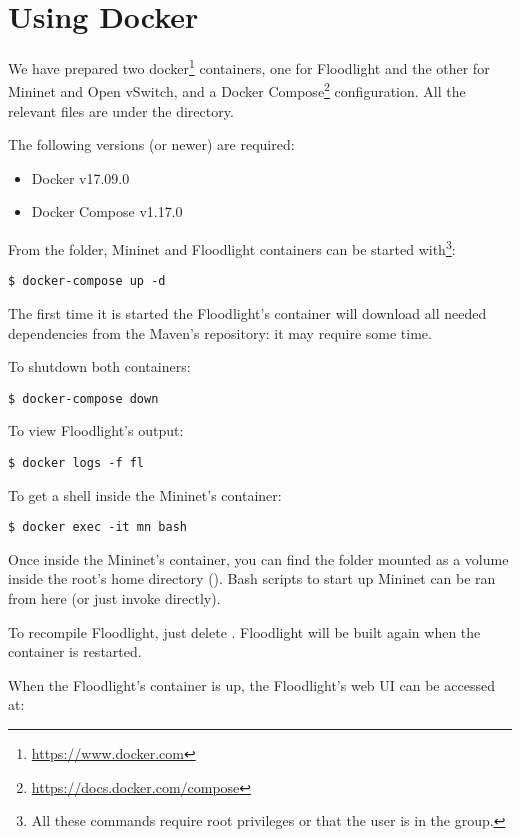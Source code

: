 \section{Using Docker}

We have prepared two docker\footnote{\url{https://www.docker.com}} containers,
one for Floodlight and the other for Mininet and Open vSwitch, and a Docker
Compose\footnote{\url{https://docs.docker.com/compose}} configuration. All the
relevant files are under the  directory.

The following versions (or newer) are required:
\begin{itemize}
	\item Docker v17.09.0
	\item Docker Compose v1.17.0
\end{itemize}

From the  folder, Mininet and Floodlight containers can be started
with\footnote{All these commands require root privileges or that the user is in
the  group.}:
\begin{verbatim}
$ docker-compose up -d
\end{verbatim}

The first time it is started the Floodlight's container will download all needed
dependencies from the Maven's repository: it may require some time.

To shutdown both containers:
\begin{verbatim}
$ docker-compose down
\end{verbatim}

To view Floodlight's output:
\begin{verbatim}
$ docker logs -f fl
\end{verbatim}

To get a shell inside the Mininet's container:
\begin{verbatim}
$ docker exec -it mn bash
\end{verbatim}
Once inside the Mininet's container, you can find the  folder
mounted as a volume inside the root's home directory ().
Bash scripts to start up Mininet can be ran from here (or just invoke 
directly).

To recompile Floodlight, just delete . Floodlight
will be built again when the container is restarted.

When the Floodlight's container is up, the Floodlight's web UI can be accessed
at:

